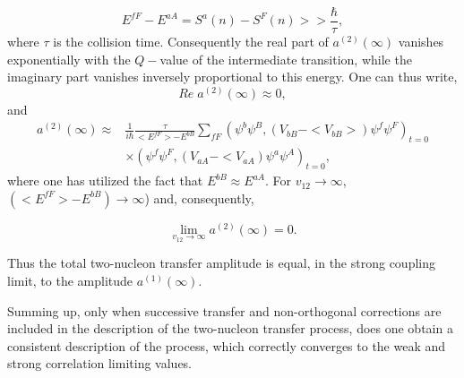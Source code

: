 \begin{equation}
E^{fF} - E^{aA} = S^a(n) - S^F(n) >> \frac{\hbar}{\tau},
\end{equation}
where $\tau$ is the collision time. Consequently the real part of $a^{(2)}(\infty)$ vanishes exponentially  with the $Q-$value of the intermediate transition, while the imaginary part  vanishes inversely proportional to this energy.
One can thus write,
\begin{equation}
Re \;  a^{(2)} (\infty) \approx 0,
\end{equation} 
and 
\begin{equation}
\begin{split}
a^{(2)}(\infty) \approx &\frac{1}{i \hbar} \frac{\tau}{<E^{fF}> - E^{bB}} 
\sum_{fF} (\psi^b \psi^B, 
(V_{bB}- <V_{bB}>) 
\psi^f\psi^F)_{t=0}\\
& \times 
(\psi^f\psi^F,(V_{aA} - <V_{aA}) \psi^a \psi^A)_{t=0},
\end{split}
\end{equation} 
where one has utilized the fact that $E^{bB} \approx E^{aA}$. For $v_{12} \to \infty$, $(<E^{fF}> - E^{bB}) \to \infty$)
and, consequently, 

\begin{equation}
\lim_{v_{12} \to \infty} a^{(2)} (\infty) = 0.
\end{equation} 

Thus the total two-nucleon transfer amplitude is equal, in the strong coupling limit, to the amplitude $a^{(1)} (\infty)$.


Summing up, only when successive transfer and non-orthogonal corrections are included in the description of the two-nucleon 
transfer process, does one obtain a consistent description of the process, which correctly converges to the weak and 
strong correlation limiting values. 

